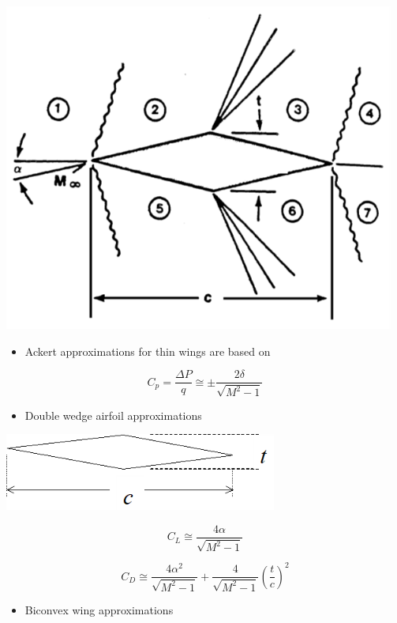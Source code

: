\documentclass[
]{book}
\providecommand{\tightlist}{%
  \setlength{\itemsep}{0pt}\setlength{\parskip}{0pt}}
\begin{document}
\includegraphics[width=5.075in,height=4.25in]{media/05/image67.png}

\begin{itemize}
\tightlist
\item
  Ackert approximations for thin wings are based on
\end{itemize}

\[C_p = \frac{\Delta P}{q} \cong \pm\frac{2 \delta}{\sqrt{M^2 - 1}} \]

\begin{itemize}
\tightlist
\item
  Double wedge airfoil approximations
\end{itemize}

\includegraphics[width=3.531in,height=1in]{media/05/image69.png}

\[C_L \cong \frac{4 \alpha}{\sqrt{M^2 - 1} }\]

\[C_D \cong \frac{4 \alpha^2}{\sqrt{M^2 - 1}} + \frac{4}{\sqrt{M^2 - 1}}\left(\frac{t}{c}\right)^2\]

\begin{itemize}
\tightlist
\item
  Biconvex wing approximations
\end{itemize}
\end{document}
